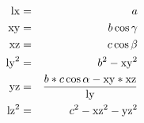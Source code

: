 \documentclass[12pt]{article}
\begin{document}
\begin{eqnarray*}
{\rm lx} &=& a \\
{\rm xy} &=& b \cos{\gamma}  \\
{\rm xz} &=& c \cos{\beta}\\
{\rm ly}^2 &=&   b^2 - {\rm xy}^2 \\
{\rm yz} &=& \frac{b*c \cos{\alpha} - {\rm xy}*{\rm xz}}{\rm ly} \\
{\rm lz}^2 &=&  c^2 - {\rm xz}^2 - {\rm yz}^2 \\
\end{eqnarray*}
\end{document}
